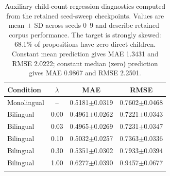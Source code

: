 \documentclass[webpdf,modern,medium,namedate]{oup-authoring-template}
\begin{document}
\begin{table}[htbp]
\centering
\caption{Structure-latent distance diagnostics across language-alignment weights. Sibling, parent-child, cross-language parent-child, and unrelated distances compare selected proposition relations. Parent-child distances are structural-role diagnostics, not a required monotonic tree-distance relation. At high weights, sibling distances increase while parent-child and unrelated distances decrease, reducing differentiation between relation types. The pattern indicates non-uniform reorganisation and weakened relational structure rather than uniform compression. All values are mean $\pm$ SD across seeds 0--9.}

\end{table}

\begin{table}[htbp]
\centering
\caption{Auxiliary child-count regression diagnostics computed from the retained seed-sweep checkpoints. Values are mean $\pm$ SD across seeds 0--9 and describe retained-corpus performance. The target is strongly skewed: 68.1\% of propositions have zero direct children. Constant mean prediction gives MAE 1.3431 and RMSE 2.0222; constant median (zero) prediction gives MAE 0.9867 and RMSE 2.2501.}
\begin{tabular}{lccc}
\toprule
Condition & $\lambda$ & MAE & RMSE \\
\midrule
Monolingual & -- & 0.5181$\pm$0.0319 & 0.7602$\pm$0.0468 \\
Bilingual & 0.00 & 0.4961$\pm$0.0262 & 0.7221$\pm$0.0343 \\
Bilingual & 0.03 & 0.4965$\pm$0.0269 & 0.7231$\pm$0.0347 \\
Bilingual & 0.10 & 0.5032$\pm$0.0257 & 0.7363$\pm$0.0336 \\
Bilingual & 0.30 & 0.5351$\pm$0.0302 & 0.7933$\pm$0.0394 \\
Bilingual & 1.00 & 0.6277$\pm$0.0390 & 0.9457$\pm$0.0677 \\
\botrule
\end{tabular}
\end{table}
\end{document}
